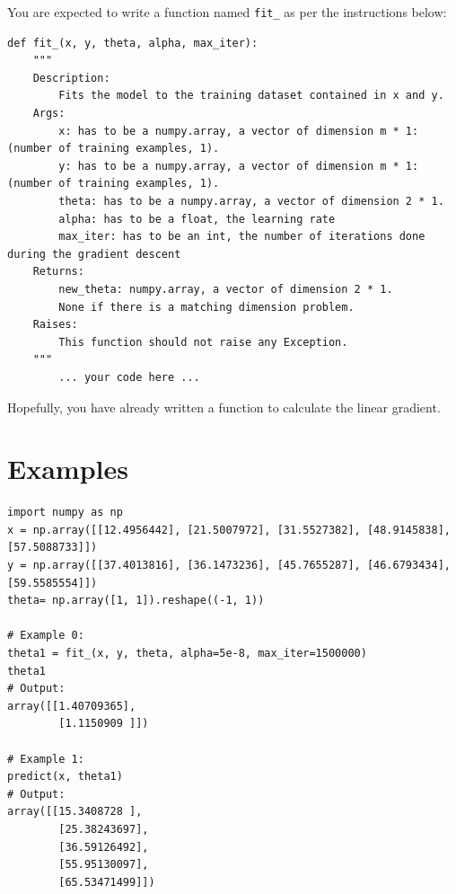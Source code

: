 \documentclass{42-en}
\begin{document}
You are expected to write a function named \texttt{fit\_} as per the instructions below:

\begin{verbatim}
def fit_(x, y, theta, alpha, max_iter):
	"""
	Description:
		Fits the model to the training dataset contained in x and y.
	Args:
		x: has to be a numpy.array, a vector of dimension m * 1: (number of training examples, 1).
		y: has to be a numpy.array, a vector of dimension m * 1: (number of training examples, 1).
		theta: has to be a numpy.array, a vector of dimension 2 * 1.
		alpha: has to be a float, the learning rate
		max_iter: has to be an int, the number of iterations done during the gradient descent
	Returns:
		new_theta: numpy.array, a vector of dimension 2 * 1.
		None if there is a matching dimension problem.
	Raises:
		This function should not raise any Exception.
	"""
		... your code here ...
\end{verbatim}

Hopefully, you have already written a function to calculate the linear gradient.


\section*{Examples}
\begin{verbatim}
import numpy as np
x = np.array([[12.4956442], [21.5007972], [31.5527382], [48.9145838], [57.5088733]])
y = np.array([[37.4013816], [36.1473236], [45.7655287], [46.6793434], [59.5585554]])
theta= np.array([1, 1]).reshape((-1, 1))

# Example 0:
theta1 = fit_(x, y, theta, alpha=5e-8, max_iter=1500000)
theta1
# Output:
array([[1.40709365],
		[1.1150909 ]])

# Example 1:
predict(x, theta1)
# Output:
array([[15.3408728 ],
		[25.38243697],
		[36.59126492],
		[55.95130097],
		[65.53471499]])
\end{verbatim}

\end{document}
